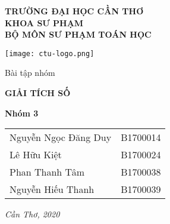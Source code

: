 \thispagestyle{empty}
\begin{center}\large
	\textbf{TRƯỜNG ĐẠI HỌC CẦN THƠ}\\
	\textbf{KHOA SƯ PHẠM}\\
	\textbf{BỘ MÔN SƯ PHẠM TOÁN HỌC}
\end{center}
\vfill
{\centering\texttt{[image: ctu-logo.png]}\par}
\vfill
{\centering\LARGE Bài tập nhóm\par}
{\centering\Huge\bfseries GIẢI TÍCH SỐ\par}
\vfill
\begin{center}\large
\textbf{Nhóm 3}\par
\begin{tabular}{ll}
	Nguyễn Ngọc Đăng Duy& B1700014\\
	Lê Hữu Kiệt&B1700024\\
	Phan Thanh Tâm& B1700038\\
	Nguyễn Hiếu Thanh& B1700039
\end{tabular}
\end{center}
\vfill
{\centering\large\textit{Cần Thơ, 2020}\par}
\newpage